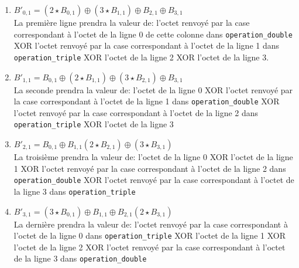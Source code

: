 \documentclass[10pt, a4paper]{report}
\begin{document}
	\begin{enumerate}
		\vspace{0.5cm}
		\item \hspace{2cm}
		\begin{math}
			B'_{0,1} = (2 \star B_{0,1}) \oplus (3 \star B_{1,1}) \oplus B_{2,1} \oplus B_{3,1}
		\end{math} \\
		La première ligne prendra la valeur de: l'octet renvoyé par la case correspondant à l'octet de la ligne 0 de cette colonne dans \verb|operation_double| XOR l'octet renvoyé par la case correspondant à l'octet de la ligne 1 dans \verb|operation_triple| XOR l'octet de la ligne 2 XOR l'octet de la ligne 3.
		\vspace{0.5cm}
		\item \hspace{2cm}
		\begin{math}
			B'_{1,1} = B_{0,1} \oplus (2 \star B_{1,1}) \oplus (3 \star B_{2,1}) \oplus B_{3,1}
		\end{math} \\
		La seconde prendra la valeur de: l'octet de la ligne 0 XOR  l'octet renvoyé par la case correspondant à l'octet de la ligne 1 dans \verb|operation_double| XOR l'octet renvoyé par la case correspondant à l'octet de la ligne 2 dans \verb|operation_triple| XOR l'octet de la ligne 3
		\vspace{0.5cm}
		\item \hspace{2cm}
		\begin{math}
			B'_{2,1} = B_{0,1} \oplus B_{1,1} (2 \star B_{2,1}) \oplus (3 \star B_{3,1})
		\end{math} \\
		La troisième prendra la valeur de: l'octet de la ligne 0 XOR l'octet de la ligne 1 XOR  l'octet renvoyé par la case correspondant à l'octet de la ligne 2 dans \verb|operation_double| XOR l'octet renvoyé par la case correspondant à l'octet de la ligne 3 dans \verb|operation_triple| 
		\vspace{0.5cm}
		\item \hspace{2cm}
		\begin{math}
			B'_{3,1} = (3 \star B_{0,1}) \oplus B_{1,1} \oplus B_{2,1} (2 \star B_{3,1})
		\end{math} \\
		La dernière prendra la valeur de: l'octet renvoyé par la case correspondant à l'octet de la ligne 0 dans \verb|operation_triple| XOR l'octet de la ligne 1 XOR l'octet de la ligne 2 XOR  l'octet renvoyé par la case correspondant à l'octet de la ligne 3 dans \verb|operation_double|
	\end{enumerate}
	
\end{document}
